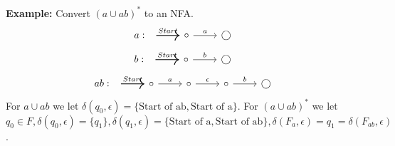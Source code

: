 \documentclass[12pt]{article}
\begin{document}
\noindent 
\textbf{Example:}
Convert \((a \cup ab)^*\) to an NFA.
\[
    a:
\begin{tikzcd}
    \arrow[r, thick, "Start"] & \circ \arrow[r, "a"] & \bigcirc
\end{tikzcd}
\]
\[
    b:
\begin{tikzcd}
    \arrow[r, thick, "Start"] & \circ \arrow[r, "b"] & \bigcirc
\end{tikzcd}
\]
\[
    ab:
\begin{tikzcd}
    \arrow[r, thick, "Start"] & \circ \arrow[r, "a"] & \circ  
    \arrow[r, "\epsilon"] & \circ \arrow[r, "b"] & \bigcirc 
\end{tikzcd}
\]
For \(a \cup ab\) we let \(\delta(q_0, \epsilon) = \{\text{Start of ab}, 
\text{Start of a}\}\).
For \((a \cup ab)^*\) we let \(q_0 \in F, \delta(q_0, \epsilon) = \{q_1\}
, \delta(q_1, \epsilon) = \{\text{Start of a}, \text{Start of ab}\}, 
\delta(F_a, \epsilon) = q_1 = \delta(F_{ab}, \epsilon)\).
\end{document}
